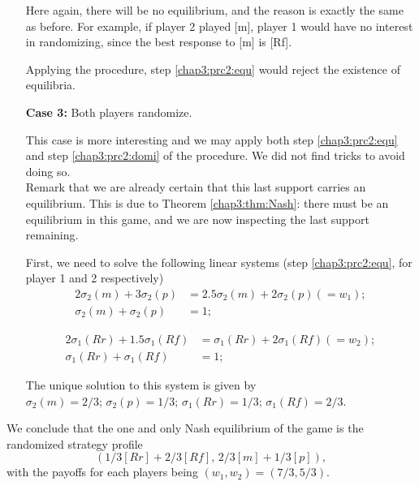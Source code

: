 \begin{example}
\begin{itemize}
Here again, there will be no equilibrium, and the reason is exactly the same as before.
For example, if player 2 played [m], player 1 would have no interest in randomizing, since the best response to [m] is [Rf].

Applying the procedure, step \ref{chap3:prc2:equ} would reject the existence of equilibria.

\item[\textbf{Case 3:}] Both players randomize.

This case is more interesting and we may apply both step \ref{chap3:prc2:equ} and step \ref{chap3:prc2:domi} of the procedure. We did not find tricks to avoid doing so.\\
Remark that we are already certain that this last support carries an equilibrium. This is due to Theorem \ref{chap3:thm:Nash}: there must be an equilibrium in this game, and we are now inspecting the last support remaining.

First, we need to solve the following linear systems (step \ref{chap3:prc2:equ}, for player 1 and 2 respectively)
\begin{equation}
\begin{aligned}
 2 \sigma_2(m) + 3 \sigma_2(p) & = 2.5 \sigma_2(m) + 2 \sigma_2(p) (= w_1); \\
 \sigma_2(m) + \sigma_2(p) & = 1;
\end{aligned}
\end{equation}

\begin{equation}
\begin{aligned}
2 \sigma_1(Rr) + 1.5 \sigma_1(Rf) & = \sigma_1(Rr) + 2 \sigma_1(Rf) (=w_2); \\
\sigma_1(Rr) + \sigma_1(Rf)&  = 1;
\end{aligned}
\end{equation}

The unique solution to this system is given by $\sigma_2(m) = 2/3; \, \sigma_2(p) = 1/3; \, \sigma_1(Rr) = 1/3; \, \sigma_1(Rf) = 2/3$.
\end{itemize}
We conclude that the one and only Nash equilibrium of the game is the randomized strategy profile
$$(1/3 [Rr] + 2/3 [Rf], \, 2/3 [m] + 1/3 [p]), $$
with the payoffs for each players being $(w_1, w_2) = (7/3, 5/3). $

\label{chap3:ex:cardgame}
\end{example}


